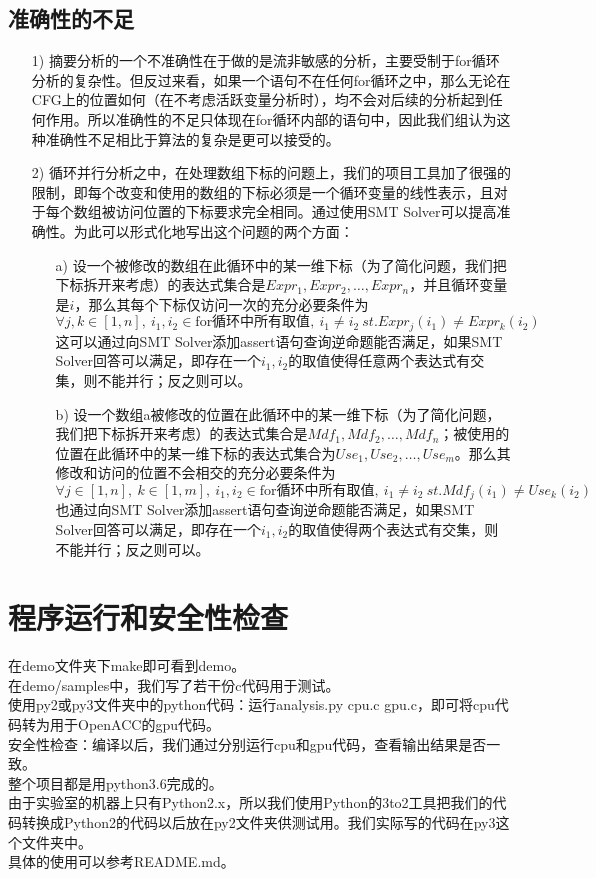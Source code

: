 \documentclass[12pt]{article}
\begin{document}
		\subsection{准确性的不足}
			\begin{itemize}
				\item[1)] 摘要分析的一个不准确性在于做的是流非敏感的分析，主要受制于for循环分析的复杂性。但反过来看，如果一个语句不在任何for循环之中，那么无论在CFG上的位置如何（在不考虑活跃变量分析时），均不会对后续的分析起到任何作用。所以准确性的不足只体现在for循环内部的语句中，因此我们组认为这种准确性不足相比于算法的复杂是更可以接受的。
				\item[2)] 循环并行分析之中，在处理数组下标的问题上，我们的项目工具加了很强的限制，即每个改变和使用的数组的下标必须是一个循环变量的线性表示，且对于每个数组被访问位置的下标要求完全相同。通过使用SMT Solver可以提高准确性。为此可以形式化地写出这个问题的两个方面：
				\begin{itemize}
					\item[a)] 设一个被修改的数组在此循环中的某一维下标（为了简化问题，我们把下标拆开来考虑）的表达式集合是$Expr_1,Expr_2,\dots ,Expr_n$，并且循环变量是$i$，那么其每个下标仅访问一次的充分必要条件为\[\forall j,k \in [1,n],\ i_1,i_2\in \text{for循环中所有取值},\ i_1\neq i_2\ st. Expr_j(i_1)\neq Expr_k(i_2)\]这可以通过向SMT Solver添加assert语句查询逆命题能否满足，如果SMT Solver回答可以满足，即存在一个$i_1,i_2$的取值使得任意两个表达式有交集，则不能并行；反之则可以。
					\item[b)] 设一个数组a被修改的位置在此循环中的某一维下标（为了简化问题，我们把下标拆开来考虑）的表达式集合是$Mdf_1,Mdf_2,\dots ,Mdf_n$；被使用的位置在此循环中的某一维下标的表达式集合为$Use_1,Use_2,\dots,Use_m$。那么其修改和访问的位置不会相交的充分必要条件为\[\forall j \in [1,n],\ k \in [1,m],\ i_1,i_2\in \text{for循环中所有取值},\ i_1\neq i_2\ st. Mdf_j(i_1)\neq Use_k(i_2)\]也通过向SMT Solver添加assert语句查询逆命题能否满足，如果SMT Solver回答可以满足，即存在一个$i_1,i_2$的取值使得两个表达式有交集，则不能并行；反之则可以。
				\end{itemize}
			\end{itemize}
	\section{程序运行和安全性检查}
		\indent 在demo文件夹下make即可看到demo。\\
		\indent 在demo/samples中，我们写了若干份c代码用于测试。\\
		\indent 使用py2或py3文件夹中的python代码：运行analysis.py cpu.c gpu.c，即可将cpu代码转为用于OpenACC的gpu代码。\\
		\indent 安全性检查：编译以后，我们通过分别运行cpu和gpu代码，查看输出结果是否一致。\\
		\indent 整个项目都是用python3.6完成的。\\
		\indent 由于实验室的机器上只有Python2.x，所以我们使用Python的3to2工具把我们的代码转换成Python2的代码以后放在py2文件夹供测试用。我们实际写的代码在py3这个文件夹中。\\
		\indent 具体的使用可以参考README.md。
\end{document}

